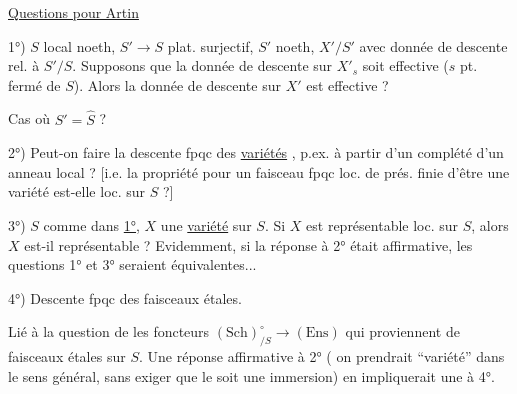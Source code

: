 \uline{Questions pour Artin}

1°) $S$  local   noeth, $S'\to S$  plat. surjectif, $S'$ noeth, $X'/S'$  avec donnée de descente rel. à $S'/S$. Supposons que la donnée de descente sur $X'_s$ soit effective ($s$ pt. fermé de $S$). Alors la donnée de descente sur $X'$ est effective ?

Cas où $S'=\widehat{S}$ ?

2°) Peut-on faire la descente fpqc des \uline{variétés} , p.ex. à partir d'un complété d'un anneau local ? [i.e. la propriété pour un faisceau fpqc loc. de prés. finie d'être une variété est-elle loc.  sur $S$ ?]


3°) $S$ comme dans \uline{1°}, $X$ une \uline{variété}  sur $S$. Si $X$ est représentable loc.  sur $S$,  alors $X$ est-il représentable ? Evidemment, si la réponse à 2°  était affirmative, les questions 1° et 3° seraient équivalentes...


4°) Descente fpqc des  faisceaux étales.

Lié à la question de  les foncteurs $(\mathrm{Sch})_{/S}^{\circ}\to(\mathrm{Ens})$ qui proviennent de  faisceaux étales sur $S$. Une réponse affirmative à 2° ( on prendrait ``variété'' dans le sens général, sans exiger que le   soit une immersion) en impliquerait une à 4°.


